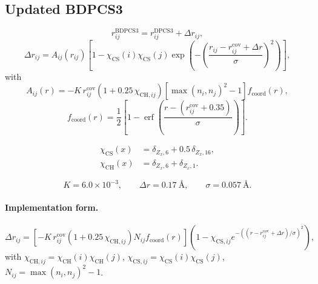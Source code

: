 \documentclass[journal=jctcce,manuscript=article]{achemso}
\begin{document}
\subsection{Updated BDPCS3}
\begin{equation}
r_{ij}^{\mathrm{BDPCS3}} = r_{ij}^{\mathrm{DPCS3}}+\Delta r_{ij},
\end{equation}
\begin{equation}
\Delta r_{ij}
=A_{ij}(r_{ij})
\left[1-\chi_{\mathrm{CS}}(i)\chi_{\mathrm{CS}}(j)
\exp\!\left(-\left(\frac{r_{ij}-r^{\mathrm{cov}}_{ij}+\Delta r}{\sigma}\right)^2\right)\right],
\end{equation}
with
\begin{equation}
A_{ij}(r)
=-K\,r^{\mathrm{cov}}_{ij}
\left(1+0.25\,\chi_{\mathrm{CH},ij}\right)
\left[\max(n_i,n_j)^2-1\right]
f_{\mathrm{coord}}(r),
\end{equation}
\begin{equation}
f_{\mathrm{coord}}(r)=\frac{1}{2}\left[1-\operatorname{erf}\!\left(\frac{r-(r^{\mathrm{cov}}_{ij}+0.35)}{\sigma}\right)\right].
\end{equation}

\begin{align}
\chi_{\mathrm{CS}}(x)&=\delta_{Z_x,6}+0.5\,\delta_{Z_x,16},\\
\chi_{\mathrm{CH}}(x)&=\delta_{Z_x,6}+\delta_{Z_x,1}.
\end{align}

\begin{equation}
K=6.0\times10^{-3},\qquad
\Delta r=0.17~\text{\AA},\qquad
\sigma=0.057~\text{\AA}.
\end{equation}

\paragraph{Implementation form.}
\begin{equation}
\Delta r_{ij}
=\left[-K\,r^{\mathrm{cov}}_{ij}(1+0.25\,\chi_{\mathrm{CH},ij})N_{ij}f_{\mathrm{coord}}(r)\right]
\left(1-\chi_{\mathrm{CS},ij}e^{-((r-r^{\mathrm{cov}}_{ij}+\Delta r)/\sigma)^2}\right),
\end{equation}
with $\chi_{\mathrm{CH},ij}=\chi_{\mathrm{CH}}(i)\chi_{\mathrm{CH}}(j)$,
$\chi_{\mathrm{CS},ij}=\chi_{\mathrm{CS}}(i)\chi_{\mathrm{CS}}(j)$,
$N_{ij}=\max(n_i,n_j)^2-1$.
\end{document}
